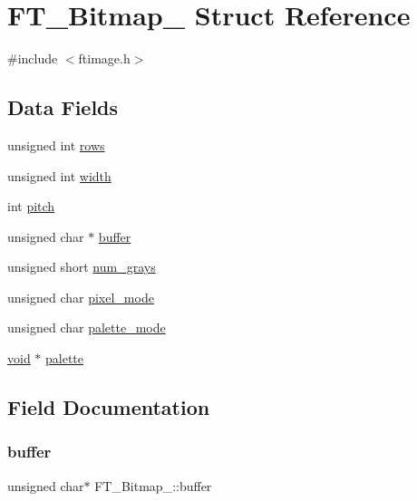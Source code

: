 \hypertarget{struct_f_t___bitmap__}{}\section{F\+T\+\_\+\+Bitmap\+\_\+ Struct Reference}
\label{struct_f_t___bitmap__}


{\ttfamily \#include $<$ftimage.\+h$>$}

\subsection*{Data Fields}
\begin{DoxyCompactItemize}
\item 
unsigned int \hyperlink{struct_f_t___bitmap___ad857f33f4d12be88746072a7e1455270}{rows}
\item 
unsigned int \hyperlink{struct_f_t___bitmap___a4a3dd62109eb0371f4ca8d196f713e4b}{width}
\item 
int \hyperlink{struct_f_t___bitmap___afdee595846e1188c7a76d0cec9d85cf2}{pitch}
\item 
unsigned char $\ast$ \hyperlink{struct_f_t___bitmap___a76439b1d3c13b81ca506108cd1623284}{buffer}
\item 
unsigned short \hyperlink{struct_f_t___bitmap___a2465f41f8badacca572203c4bdb473e3}{num\+\_\+grays}
\item 
unsigned char \hyperlink{struct_f_t___bitmap___a9bf1180f0b73c4161305ff0166f2652f}{pixel\+\_\+mode}
\item 
unsigned char \hyperlink{struct_f_t___bitmap___a46b396401785e1cd90066f9cd11507f6}{palette\+\_\+mode}
\item 
\hyperlink{png_8h_ac9c84fa68bbad002983e35ce3663c686}{void} $\ast$ \hyperlink{struct_f_t___bitmap___a8d5ecf4409f71bfb559e0d13d8df4d86}{palette}
\end{DoxyCompactItemize}


\subsection{Field Documentation}
\mbox{\label{struct_f_t___bitmap___a76439b1d3c13b81ca506108cd1623284}} 
\subsubsection{\texorpdfstring{buffer}{buffer}}
{\footnotesize\ttfamily unsigned char$\ast$ F\+T\+\_\+\+Bitmap\+\_\+\+::buffer}

